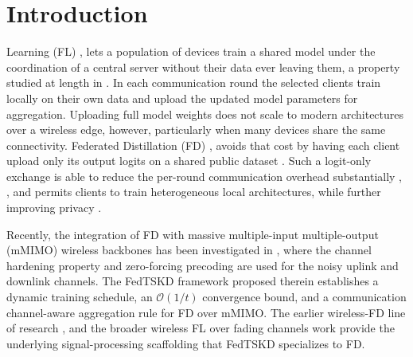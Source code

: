 \documentclass[journal]{IEEEtran}
\newcommand{\rev}[1]{{\color{blue}#1}}
\begin{document}
{\renewcommand{\abstractname}{Impact Statement}
\begin{abstract}
\rev{Wireless networks are starting to train shared artificial intelligence models across phones, wearables and vehicles. The data never leaves the device. Only a handful of devices can be served in each training round. Picking them at random means some devices contribute far more than others. Whose data shapes the model then becomes partly a matter of chance. This work replaces that lottery with a rotation. Its fairness follows from three quantities a network operator already knows. It can therefore be stated before a deployment is switched on rather than measured after it has run. Operators give up no accuracy in exchange. Artificial intelligence systems face a growing legal duty to evidence fair treatment of the people they serve. Committing to a participation guarantee in advance, rather than reporting one in hindsight, changes what a deployment can promise its users and its regulators.}
\end{abstract}}
\vspace{-1em}
\section{Introduction}
\label{sec:introduction}
 Learning (FL) \cite{mcmahan2017communication}, \cite{borazjani2026redefining} lets a population of devices train a shared model under the coordination of a central server without their data ever leaving them, a property studied at length in \cite{rao2025privacy, lim2020federated, huang2024survey, lu2024noniid}. In each communication round the selected clients train locally on their own data and upload the updated model parameters for aggregation. Uploading full model weights does not scale to modern architectures over a wireless edge, however, particularly when many devices share the same connectivity. Federated Distillation (FD) \cite{jeong2018communication}, \cite{xing2022efficient} avoids that cost by having each client upload only its output logits on a shared public dataset \cite{itahara2023distillation}. Such a logit-only exchange is able to reduce the per-round communication overhead substantially \cite{sattler2022cfd}, \cite{sattler2023fedaux}, and permits clients to train heterogeneous local architectures, while further improving privacy \cite{chan2021fedhe, cho2023clustered, wu2024fedict}.

Recently, the integration of FD with massive multiple-input multiple-output (mMIMO) wireless backbones has been investigated in \cite{mu2024fedtskd}, where the channel hardening property and zero-forcing precoding are used for the noisy uplink and downlink channels. The FedTSKD framework proposed therein establishes a dynamic training schedule, an $\mathcal{O}(1/t)$ convergence bound, and a communication channel-aware aggregation rule for FD over mMIMO. The earlier wireless-FD line of research \cite{ahn2019wireless}, \cite{ahn2020cooperative} and the broader wireless FL over fading channels work \cite{amiri2020federated, amiri2020machine, vu2020cell, amiri2021convergence} provide the underlying signal-processing scaffolding that FedTSKD specializes to FD.
\end{document}
